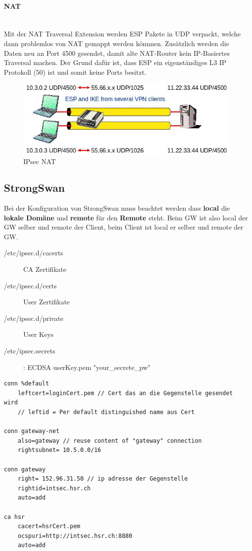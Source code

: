 \paragraph{NAT} \hfill \\
Mit der NAT Traversal Extension werden ESP Pakete in UDP verpackt, welche dann problemlos von NAT gemappt werden könnnen. Zusätzlich werden die Daten neu an Port 4500 gesendet, damit alte NAT-Router kein IP-Basiertes Traversal machen. Der Grund dafür ist, dass ESP ein eigenständiges L3 IP Protokoll (50) ist und somit keine Ports besitzt.
\begin{figure}[h]
\centering
\includegraphics[width=0.5\linewidth]{images/ipsec_nat}
\caption{IPsec NAT}
\label{fig:ipsecnat}
\end{figure}

\subsection{StrongSwan}
Bei der Konfiguration von StrongSwan muss beachtet werden dass \textbf{local} die \textbf{lokale Domäne} und \textbf{remote} für den \textbf{Remote} steht. Beim GW ist also local der GW selber und remote der Client, beim Client ist local er selber und remote der GW.
\begin{description}
	\item[/etc/ipsec.d/cacerts] CA Zertifikate
	\item[/etc/ipsec.d/certs] User Zertifikate
	\item[/etc/ipsec.d/private] User Keys
	\item[/etc/ipsec.secrets] : ECDSA userKey.pem "your\_secrete\_pw"
\end{description}

\begin{lstlisting}[caption=/etc/ipsec.conf]
conn %default  
	leftcert=loginCert.pem // Cert das an die Gegenstelle gesendet wird
	// leftid = Per default distinguished name aus Cert

conn gateway-net 
	also=gateway // reuse content of "gateway" connection
	rightsubnet= 10.5.0.0/16

conn gateway 
	right= 152.96.31.50 // ip adresse der Gegenstelle
	rightid=intsec.hsr.ch 
	auto=add
	
ca hsr 
	cacert=hsrCert.pem
	ocspuri=http://intsec.hsr.ch:8880
	auto=add
\end{lstlisting}

